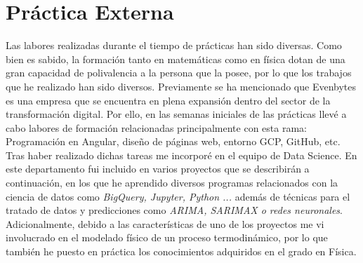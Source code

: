 %
%
\section{Práctica Externa} \label{practica externa}
%
%
Las labores realizadas durante el tiempo de prácticas han sido diversas. Como bien es sabido, la formación tanto en matemáticas como en física dotan de una gran capacidad de polivalencia a la persona que la posee, por lo que los trabajos que he realizado han sido diversos. Previamente se ha mencionado que Evenbytes es una empresa que se encuentra en plena expansión dentro del sector de la transformación digital. Por ello, en las semanas iniciales de las prácticas llevé a cabo labores de formación relacionadas principalmente con esta rama: Programación en Angular, diseño de páginas web, entorno GCP, GitHub, etc. Tras haber realizado dichas tareas me incorporé en el equipo de Data Science. En este departamento fui incluido en varios proyectos que se describirán a continuación, en los que he aprendido diversos programas relacionados con la ciencia de datos como \textit{BigQuery, Jupyter, Python ...} además de técnicas para el tratado de datos y predicciones como \textit{ARIMA, SARIMAX o redes neuronales}. Adicionalmente, debido a las características de uno de los proyectos me vi involucrado en el modelado físico de un proceso termodinámico, por lo que también he puesto en práctica los conocimientos adquiridos en el grado en Física.